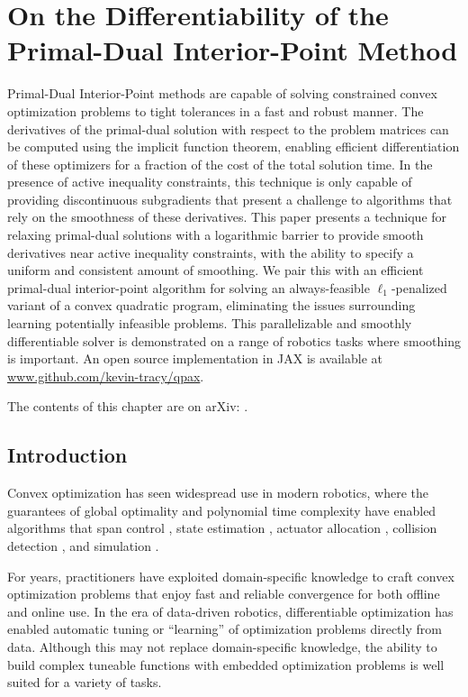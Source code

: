 \graphicspath{{qpax/}}


\chapter{On the Differentiability of the \\Primal-Dual Interior-Point Method}
\label{sec:qpax}

Primal-Dual Interior-Point methods are capable of solving constrained convex optimization problems to tight tolerances in a fast and robust manner. 
The derivatives of the primal-dual solution with respect to the problem matrices can be computed using the implicit function theorem, enabling efficient differentiation of these optimizers for a fraction of the cost of the total solution time. 
In the presence of active inequality constraints, this technique is only capable of providing discontinuous subgradients that present a challenge to algorithms that rely on the smoothness of these derivatives. 
This paper presents a technique for relaxing primal-dual solutions with a logarithmic barrier to provide smooth derivatives near active inequality constraints, with the ability to specify a uniform and consistent amount of smoothing. 
We pair this with an efficient primal-dual interior-point algorithm for solving an always-feasible $\ell_1$-penalized variant of a convex quadratic program, eliminating the issues surrounding learning potentially infeasible problems.
This parallelizable and smoothly differentiable solver is demonstrated on a range of robotics tasks where smoothing is important. An open source implementation in JAX is available at \url{www.github.com/kevin-tracy/qpax}.

The contents of this chapter are on arXiv: \citet{tracy2024}.
%
%
\section{Introduction}
%
%
Convex optimization has seen widespread use in modern robotics, where the guarantees of global optimality and polynomial time complexity have enabled algorithms that span control \cite{kuindersma2014a,blackmore2016}, state estimation \cite{varin2020,xinjilefu2014}, actuator allocation \cite{tracy2023d,kirchengast2018}, collision detection \cite{gilbert1994,tracy2023b}, and simulation \cite{anitescu2006,pang2021}. 

For years, practitioners have exploited domain-specific knowledge to craft convex optimization problems that enjoy fast and reliable convergence for both offline and online use. 
In the era of data-driven robotics, differentiable optimization has enabled automatic tuning or ``learning'' of optimization problems directly from data. Although this may not replace domain-specific knowledge, the ability to build complex tuneable functions with embedded optimization problems is well suited for a variety of tasks. 

